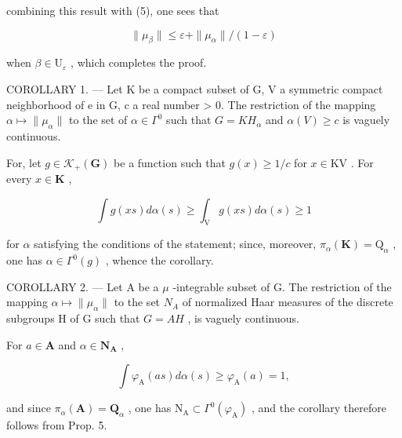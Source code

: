 combining this result with (5), one sees that

\[
\| \mu_ {\beta} \| \leqslant \varepsilon + \| \mu_ {\alpha} \| / (1 - \varepsilon)
\]

when \(\beta \in \mathrm{U}_{\varepsilon}\) , which completes the proof.

COROLLARY 1. --- Let K be a compact subset of G, V a symmetric compact neighborhood of e in G, c a real number \textgreater{} 0. The restriction of the mapping \(\alpha \mapsto \|\mu_{\alpha}\|\) to the set of \(\alpha \in \Gamma^0\) such that \(G = KH_{\alpha}\) and \(\alpha(V) \geqslant c\) is vaguely continuous.

For, let \(g \in \mathcal{K}_{+}(\mathbf{G})\) be a function such that \(g(x) \geqslant 1 / c\) for \(x \in \mathrm{KV}\) . For every \(x \in \mathbf{K}\) ,

\[
\int g (x s) d \alpha (s) \geqslant \int_ {\mathrm{V}} g (x s) d \alpha (s) \geqslant 1
\]

for \(\alpha\) satisfying the conditions of the statement; since, moreover, \(\pi_{\alpha}(\mathbf{K}) = \mathrm{Q}_{\alpha}\) , one has \(\alpha \in \Gamma^0(g)\) , whence the corollary.

COROLLARY 2. --- Let A be a \(\mu\) -integrable subset of G. The restriction of the mapping \(\alpha \mapsto \|\mu_{\alpha}\|\) to the set \(N_A\) of normalized Haar measures of the discrete subgroups H of G such that \(G = AH\) , is vaguely continuous.

For \(a \in \mathbf{A}\) and \(\alpha \in \mathbf{N}_{\mathbf{A}}\) ,

\[
\int \varphi_ {\mathrm{A}} (a s) d \alpha (s) \geqslant \varphi_ {\mathrm{A}} (a) = 1,
\]

and since \(\pi_{\alpha}(\mathbf{A}) = \mathbf{Q}_{\alpha}\) , one has \(\mathrm{N}_{\mathrm{A}} \subset \Gamma^{0}(\varphi_{\mathrm{A}})\) , and the corollary therefore follows from Prop. 5.

